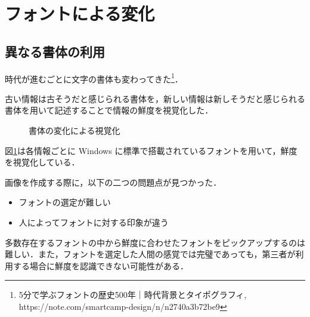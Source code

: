 \section{フォントによる変化}
\label{sec:ver-font}

\subsection{異なる書体の利用}
\label{subsec:ver-fnt-stl}

時代が進むごとに文字の書体も変わってきた\footnote{5分で学ぶフォントの歴史500年｜時代背景とタイポグラフィ, https://note.com/smartcamp-design/n/n2740a3b72be9}．

古い情報は古そうだと感じられる書体を，新しい情報は新しそうだと感じられる書体を用いて記述することで情報の鮮度を視覚化した．

\begin{figure}[htbp]
  \begin{center}
  \end{center}
  \caption{書体の変化による視覚化}
  \label{fig:ver-style}
\end{figure}

図\ref{fig:ver-style}は各情報ごとに Windows に標準で搭載されているフォントを用いて，鮮度を視覚化している．

画像を作成する際に，以下の二つの問題点が見つかった．

\begin{itemize}
  \item フォントの選定が難しい
  \item 人によってフォントに対する印象が違う
\end{itemize}

多数存在するフォントの中から鮮度に合わせたフォントをピックアップするのは難しい．また，フォントを選定した人間の感覚では完璧であっても，第三者が利用する場合に鮮度を認識できない可能性がある．

